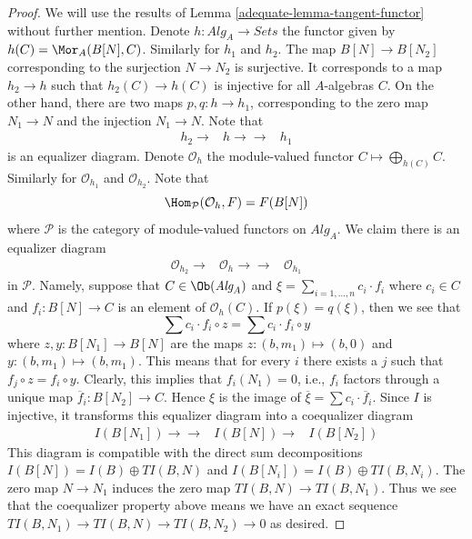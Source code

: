 \begin{proof}

We will use the results of
Lemma \ref{adequate-lemma-tangent-functor}
without further mention.
Denote $h : \textit{Alg}_A \to \textit{Sets}$ the functor given by
$h(C) = \Mor_A(B[N], C)$. Similarly for $h_1$ and $h_2$.
The map $B[N] \to B[N_2]$ corresponding to the surjection $N \to N_2$
is surjective. It corresponds to a map $h_2 \to h$ such that
$h_2(C) \to h(C)$ is injective for all $A$-algebras $C$. On the other
hand, there are two maps $p, q : h \to h_1$, corresponding to the
zero map $N_1 \to N$ and the injection $N_1 \to N$. Note that
$$
\begin{array}{ccc}h_2 \longrightarrow & h \longrightarrow\longrightarrow & h_1\end{array}
$$
is an equalizer diagram. Denote $\mathcal{O}_h$ the module-valued functor
$C \mapsto \bigoplus_{h(C)} C$. Similarly for $\mathcal{O}_{h_1}$ and
$\mathcal{O}_{h_2}$. Note that
$$
\Hom_\mathcal{P}(\mathcal{O}_h, F) = F(B[N])
$$
where $\mathcal{P}$ is the category of module-valued functors on
$\textit{Alg}_A$. We claim there is an equalizer diagram
$$
\begin{array}{ccc}\mathcal{O}_{h_2} \longrightarrow & \mathcal{O}_h \longrightarrow\longrightarrow & \mathcal{O}_{h_1}\end{array}
$$
in $\mathcal{P}$. Namely, suppose that $C \in \Ob(\textit{Alg}_A)$
and $\xi = \sum_{i = 1, \ldots, n} c_i \cdot f_i$ where $c_i \in C$ and
$f_i : B[N] \to C$ is an element of
$\mathcal{O}_h(C)$. If $p(\xi) = q(\xi)$, then
we see that
$$
\sum c_i \cdot f_i \circ z = \sum c_i \cdot f_i \circ y
$$
where $z, y : B[N_1] \to B[N]$ are the maps $z : (b, m_1) \mapsto (b, 0)$
and $y : (b, m_1) \mapsto (b, m_1)$. This means that for every $i$
there exists a $j$ such that $f_j \circ z = f_i \circ y$. Clearly, this
implies that $f_i(N_1) = 0$, i.e., $f_i$ factors through a unique map
$\overline{f}_i : B[N_2] \to C$. Hence $\xi$ is the image of
$\overline{\xi} = \sum c_i \cdot \overline{f}_i$.
Since $I$ is injective, it transforms this equalizer diagram
into a coequalizer diagram
$$
\begin{array}{ccc}I(B[N_1]) \longrightarrow\longrightarrow & I(B[N]) \longrightarrow & I(B[N_2])\end{array}
$$
This diagram is compatible with the direct sum decompositions
$I(B[N]) = I(B) \oplus TI(B, N)$ and $I(B[N_i]) = I(B) \oplus TI(B, N_i)$.
The zero map $N \to N_1$ induces the zero map $TI(B, N) \to TI(B, N_1)$.
Thus we see that the coequalizer property
above means we have an exact sequence
$TI(B, N_1) \to TI(B, N) \to TI(B, N_2) \to 0$
as desired.
\end{proof}

